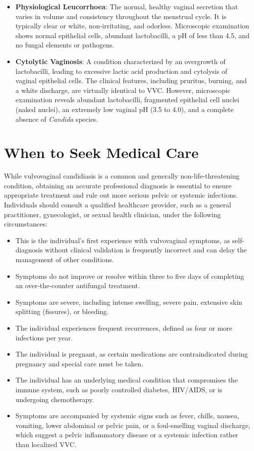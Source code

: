 \begin{itemize}
    \item \textbf{Physiological Leucorrhoea}: The normal, healthy vaginal secretion that varies in volume and consistency throughout the menstrual cycle. It is typically clear or white, non-irritating, and odorless. Microscopic examination shows normal epithelial cells, abundant lactobacilli, a pH of less than 4.5, and no fungal elements or pathogens.
    \item \textbf{Cytolytic Vaginosis}: A condition characterized by an overgrowth of lactobacilli, leading to excessive lactic acid production and cytolysis of vaginal epithelial cells. The clinical features, including pruritus, burning, and a white discharge, are virtually identical to VVC. However, microscopic examination reveals abundant lactobacilli, fragmented epithelial cell nuclei (naked nuclei), an extremely low vaginal pH (3.5 to 4.0), and a complete absence of \textit{Candida} species.
\end{itemize}

\section*{When to Seek Medical Care}
While vulvovaginal candidiasis is a common and generally non-life-threatening condition, obtaining an accurate professional diagnosis is essential to ensure appropriate treatment and rule out more serious pelvic or systemic infections. Individuals should consult a qualified healthcare provider, such as a general practitioner, gynecologist, or sexual health clinician, under the following circumstances:
\begin{itemize}
    \item This is the individual's first experience with vulvovaginal symptoms, as self-diagnosis without clinical validation is frequently incorrect and can delay the management of other conditions.
    \item Symptoms do not improve or resolve within three to five days of completing an over-the-counter antifungal treatment.
    \item Symptoms are severe, including intense swelling, severe pain, extensive skin splitting (fissures), or bleeding.
    \item The individual experiences frequent recurrences, defined as four or more infections per year.
    \item The individual is pregnant, as certain medications are contraindicated during pregnancy and special care must be taken.
    \item The individual has an underlying medical condition that compromises the immune system, such as poorly controlled diabetes, HIV/AIDS, or is undergoing chemotherapy.
    \item Symptoms are accompanied by systemic signs such as fever, chills, nausea, vomiting, lower abdominal or pelvic pain, or a foul-smelling vaginal discharge, which suggest a pelvic inflammatory disease or a systemic infection rather than localized VVC.
\end{itemize}

